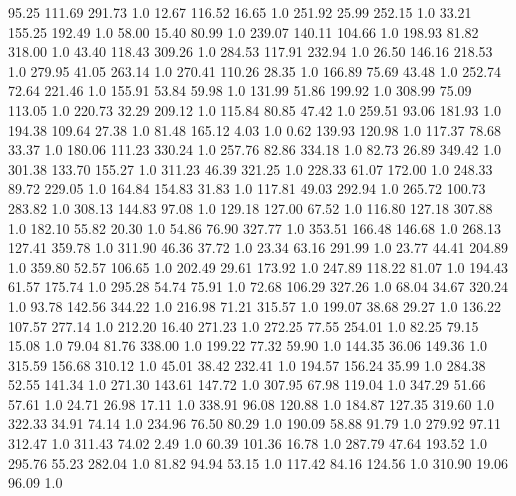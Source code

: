    95.25   111.69   291.73  1.0
   12.67   116.52    16.65  1.0
  251.92    25.99   252.15  1.0
   33.21   155.25   192.49  1.0
   58.00    15.40    80.99  1.0
  239.07   140.11   104.66  1.0
  198.93    81.82   318.00  1.0
   43.40   118.43   309.26  1.0
  284.53   117.91   232.94  1.0
   26.50   146.16   218.53  1.0
  279.95    41.05   263.14  1.0
  270.41   110.26    28.35  1.0
  166.89    75.69    43.48  1.0
  252.74    72.64   221.46  1.0
  155.91    53.84    59.98  1.0
  131.99    51.86   199.92  1.0
  308.99    75.09   113.05  1.0
  220.73    32.29   209.12  1.0
  115.84    80.85    47.42  1.0
  259.51    93.06   181.93  1.0
  194.38   109.64    27.38  1.0
   81.48   165.12     4.03  1.0
    0.62   139.93   120.98  1.0
  117.37    78.68    33.37  1.0
  180.06   111.23   330.24  1.0
  257.76    82.86   334.18  1.0
   82.73    26.89   349.42  1.0
  301.38   133.70   155.27  1.0
  311.23    46.39   321.25  1.0
  228.33    61.07   172.00  1.0
  248.33    89.72   229.05  1.0
  164.84   154.83    31.83  1.0
  117.81    49.03   292.94  1.0
  265.72   100.73   283.82  1.0
  308.13   144.83    97.08  1.0
  129.18   127.00    67.52  1.0
  116.80   127.18   307.88  1.0
  182.10    55.82    20.30  1.0
   54.86    76.90   327.77  1.0
  353.51   166.48   146.68  1.0
  268.13   127.41   359.78  1.0
  311.90    46.36    37.72  1.0
   23.34    63.16   291.99  1.0
   23.77    44.41   204.89  1.0
  359.80    52.57   106.65  1.0
  202.49    29.61   173.92  1.0
  247.89   118.22    81.07  1.0
  194.43    61.57   175.74  1.0
  295.28    54.74    75.91  1.0
   72.68   106.29   327.26  1.0
   68.04    34.67   320.24  1.0
   93.78   142.56   344.22  1.0
  216.98    71.21   315.57  1.0
  199.07    38.68    29.27  1.0
  136.22   107.57   277.14  1.0
  212.20    16.40   271.23  1.0
  272.25    77.55   254.01  1.0
   82.25    79.15    15.08  1.0
   79.04    81.76   338.00  1.0
  199.22    77.32    59.90  1.0
  144.35    36.06   149.36  1.0
  315.59   156.68   310.12  1.0
   45.01    38.42   232.41  1.0
  194.57   156.24    35.99  1.0
  284.38    52.55   141.34  1.0
  271.30   143.61   147.72  1.0
  307.95    67.98   119.04  1.0
  347.29    51.66    57.61  1.0
   24.71    26.98    17.11  1.0
  338.91    96.08   120.88  1.0
  184.87   127.35   319.60  1.0
  322.33    34.91    74.14  1.0
  234.96    76.50    80.29  1.0
  190.09    58.88    91.79  1.0
  279.92    97.11   312.47  1.0
  311.43    74.02     2.49  1.0
   60.39   101.36    16.78  1.0
  287.79    47.64   193.52  1.0
  295.76    55.23   282.04  1.0
   81.82    94.94    53.15  1.0
  117.42    84.16   124.56  1.0
  310.90    19.06    96.09  1.0
